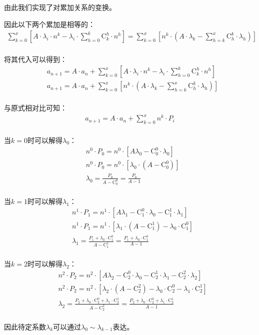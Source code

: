 \documentclass[UTF8]{ctexart}
\newcommand{\Co}{\mathrm{C}}
\begin{document}
    由此我们实现了对累加关系的变换。

\newpage

    因此以下两个累加是相等的：
    \begin{align}
        \sum_{k=0}^x\left[A\cdot\lambda_i\cdot n^k-\lambda_i\cdot\sum_{h=0}^{k}\Co_k^h\cdot n^h\right]
        =
        \sum_{k=0}^x\left[n^k\cdot\left(A\cdot\lambda_k-\sum_{h=k}^x\Co_h^k\cdot\lambda_h\right)\right]
    \end{align}\\
    将其代入可以得到：
    \begin{align}
        &a_{n+1}=A\cdot a_n+\sum_{k=0}^x\left[A\cdot\lambda_i\cdot n^k-\lambda_i\cdot\sum_{h=0}^{k}\Co_k^h\cdot n^h\right]\\[3mm]
        &a_{n+1}=A\cdot a_n+\sum_{k=0}^x\left[n^k\cdot\left(A\cdot\lambda_k-\sum_{h=k}^x\Co_h^k\cdot\lambda_h\right)\right]
    \end{align}\\
    与原式相对比可知：
    \begin{align}
        a_{n+1}=A\cdot a_n+\sum_{k=0}^xn^k\cdot P_i
    \end{align}\\
    当$k=0$时可以解得$\lambda_0$：
    \begin{align}
        &n^0\cdot P_0=n^0\cdot[A\lambda_0-\Co_0^0\cdot\lambda_0]\\[3mm]
        &n^0\cdot P_0=n^0\cdot[\lambda_0\cdot(A-\Co_0^0)]\\[3mm]
        &\lambda_0=\frac{P_0}{A-\Co_0^0}=\frac{P_0}{A-1}
    \end{align}\\
    当$k=1$时可以解得$\lambda_1$：
    \begin{align}
        &n^1\cdot P_1=n^1\cdot[A\lambda_1-\Co_1^0\cdot\lambda_0-\Co_1^1\cdot\lambda_1]\\[3mm]
        &n^1\cdot P_1=n^1\cdot[\lambda_1\cdot(A-\Co_1^1)-\lambda_0\cdot\Co_1^0]\\[3mm]
        &\lambda_1=\frac{P_1+\lambda_0\cdot\Co_1^0}{A-\Co_1^1}=\frac{P_1+\lambda_0\cdot\Co_1^0}{A-1}
    \end{align}\\
    当$k=2$时可以解得$\lambda_2$：
    \begin{align}
        &n^2\cdot P_2=n^2\cdot[A\lambda_2-\Co_2^0\cdot\lambda_0-\Co_2^1\cdot\lambda_1-\Co_2^2\cdot\lambda_2]\\[3mm]
        &n^2\cdot P_2=n^2\cdot[\lambda_2\cdot(A-\Co_2^2)-\lambda_0\cdot\Co_2^0-\lambda_1\cdot\Co_2^1]\\[3mm]
        &\lambda_2=\frac{P_2+\lambda_0\cdot\Co_2^0+\lambda_1\cdot\Co_2^1}{A-\Co_2^2}=\frac{P_2+\lambda_0\cdot\Co_2^0+\lambda_1\cdot\Co_2^1}{A-1}
    \end{align}\\
    因此待定系数$\lambda_k$可以通过$\lambda_0\sim\lambda_{k-1}$表达。
\end{document}
